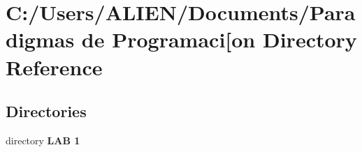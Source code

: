 \section{C\+:/\+Users/\+A\+L\+I\+E\+N/\+Documents/\+Paradigmas de Programaci[on Directory Reference}
\label{dir_9ce391bf0ac96ed90a36fd2a9e8a29e1}\index{C\+:/\+Users/\+A\+L\+I\+E\+N/\+Documents/\+Paradigmas de Programaci[on Directory Reference@{C\+:/\+Users/\+A\+L\+I\+E\+N/\+Documents/\+Paradigmas de Programaci[on Directory Reference}}
\subsection*{Directories}
\begin{DoxyCompactItemize}
\item 
directory {\bf L\+A\+B 1}
\end{DoxyCompactItemize}
